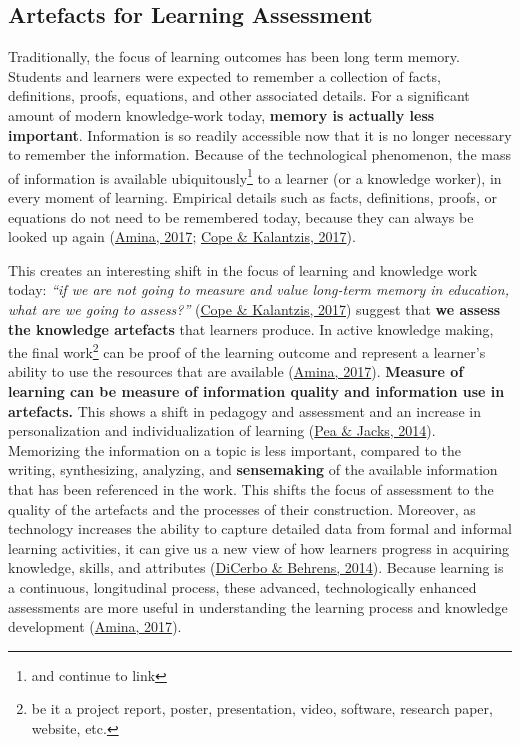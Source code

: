 \documentclass[a4paper, nobind]{templates/ociamthesis}
\begin{document}
\hypertarget{sec:bg_learn_artefact}{%
\subsection{Artefacts for Learning Assessment}\label{sec:bg_learn_artefact}}

Traditionally, the focus of learning outcomes has been long term memory.
Students and learners were expected to remember a collection of facts,
definitions, proofs, equations, and other associated details. For a
significant amount of modern knowledge-work today, \textbf{memory is actually
less important}. Information is so readily accessible now that it is no
longer necessary to remember the information. Because of the
technological phenomenon, the mass of information is available
ubiquitously\footnote{and continue to link} to a learner (or a knowledge worker), in every moment
of learning. Empirical details such as facts, definitions, proofs, or
equations do not need to be remembered today, because they can always be
looked up again (\protect\hyperlink{ref-amina2017active}{Amina, 2017}; \protect\hyperlink{ref-cope2017elearningc}{Cope \& Kalantzis, 2017}).

This creates an interesting shift in the focus of learning and knowledge
work today: \emph{``if we are not going to measure and value long-term memory
in education, what are we going to assess?''} (\protect\hyperlink{ref-cope2017elearningc}{Cope \& Kalantzis, 2017})
suggest that \textbf{we assess the knowledge artefacts} that learners
produce. In active knowledge making, the final work\footnote{be it a project report, poster, presentation, video, software,
  research paper, website, etc.} can be proof of
the learning outcome and represent a learner's ability to use the
resources that are available (\protect\hyperlink{ref-amina2017active}{Amina, 2017}). \textbf{Measure of learning
can be measure of information quality and information use in
artefacts.} This shows a shift in pedagogy and assessment and an
increase in personalization and individualization of learning
(\protect\hyperlink{ref-pea2014learning}{Pea \& Jacks, 2014}). Memorizing the information on a topic is less
important, compared to the writing, synthesizing, analyzing, and
\textbf{sensemaking} of the available information that has been referenced in
the work. This shifts the focus of assessment to the quality of the
artefacts and the processes of their construction. Moreover, as
technology increases the ability to capture detailed data from formal
and informal learning activities, it can give us a new view of how
learners progress in acquiring knowledge, skills, and attributes
(\protect\hyperlink{ref-dicerbo2014impacts}{DiCerbo \& Behrens, 2014}). Because learning is a continuous, longitudinal
process, these advanced, technologically enhanced assessments are more
useful in understanding the learning process and knowledge development
(\protect\hyperlink{ref-amina2017active}{Amina, 2017}).
\end{document}

